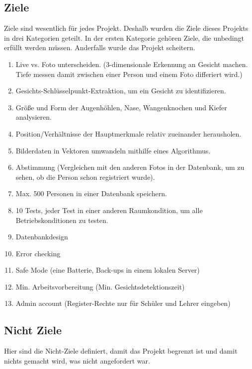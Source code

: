 \subsection{Ziele}
Ziele sind wesentlich für jedes Projekt. Deshalb wurden die Ziele dieses Projekts in drei Kategorien geteilt.
In der ersten Kategorie gehören Ziele, die unbedingt erfüllt werden müssen. Anderfalls wurde das Projekt scheitern.
\begin{enumerate}
	\item Live vs. Foto unterscheiden. 
	(3-dimensionale Erkennung an Gesicht machen. Tiefe messen damit zwischen einer Person und einem Foto differiert wird.)
	
	\item Gesichts-Schlüsselpunkt-Extraktion, um ein Gesicht zu identifizieren.

	\item Größe und Form der Augenhöhlen, Nase, Wangenknochen und Kiefer analysieren. 
	
	\item Position/Verhältnisse der Hauptmerkmale relativ zueinander herausholen. 
	
	\item Bilderdaten in Vektoren umwandeln mithilfe eines Algorithmus. 
	
	\item Abstimmung (Vergleichen mit den anderen Fotos in der Datenbank, um zu sehen, ob die Person schon registriert wurde). 
	
	\item Max. 500 Personen in einer Datenbank speichern.
	
	\item 10 Tests, jeder Test in einer anderen Raumkondition, um    alle Betriebskonditionen zu testen. 
	
	\item Datenbankdesign 
	
	\item Error checking
	
	\item Safe Mode (eine Batterie, Back-ups in einem lokalen         Server) 
	
	\item Min. Arbeitsvorbereitung (Min. Gesichtsdetektionszeit)
	\item Admin account (Register-Rechte nur für Schüler und Lehrer eingeben) 

\end{enumerate}
\subsection{Nicht Ziele}
Hier sind die Nicht-Ziele definiert, damit das Projekt begrenzt ist und damit nichts gemacht wird, was nicht angefordert war.

